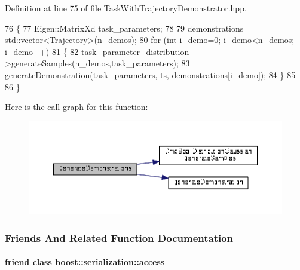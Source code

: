 Definition at line 75 of file Task\+With\+Trajectory\+Demonstrator.\+hpp.


\begin{DoxyCode}
76   \{
77     Eigen::MatrixXd task\_parameters;
78     
79     demonstrations = std::vector<Trajectory>(n\_demos);
80     \textcolor{keywordflow}{for} (\textcolor{keywordtype}{int} i\_demo=0; i\_demo<n\_demos; i\_demo++)
81     \{
82       task\_parameter\_distribution->generateSamples(n\_demos,task\_parameters);
83       \hyperlink{classDmpBbo_1_1TaskWithTrajectoryDemonstrator_a3f4561d78c6163ff208b776944f347eb}{generateDemonstration}(task\_parameters, ts, demonstrations[i\_demo]); 
84     \}
85     
86   \}
\end{DoxyCode}


Here is the call graph for this function\+:
\nopagebreak
\begin{figure}[H]
\begin{center}
\leavevmode
\includegraphics[width=350pt]{classDmpBbo_1_1TaskWithTrajectoryDemonstrator_a5c2d9a04a42b55b5b1249b7a643761e5_cgraph}
\end{center}
\end{figure}




\subsubsection{Friends And Related Function Documentation}
\hypertarget{classDmpBbo_1_1TaskWithTrajectoryDemonstrator_ac98d07dd8f7b70e16ccb9a01abf56b9c}{
\paragraph[{boost\+::serialization\+::access}]{\setlength{\rightskip}{0pt plus 5cm}friend class boost\+::serialization\+::access\hspace{0.3cm}{\ttfamily [friend]}}}\label{classDmpBbo_1_1TaskWithTrajectoryDemonstrator_ac98d07dd8f7b70e16ccb9a01abf56b9c}


